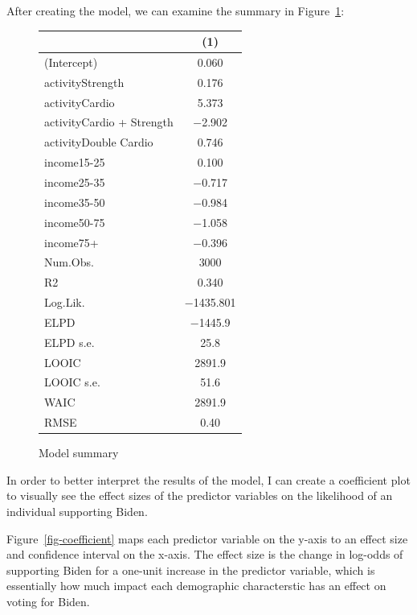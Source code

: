 \documentclass[
  letterpaper,
  DIV=11,
  numbers=noendperiod]{scrartcl}
\begin{document}
After creating the model, we can examine the summary in
Figure~\ref{fig-summary}:

\begin{figure}

{\centering 

\hypertarget{fig-summary-1}{}
\begin{table}
\centering
\begin{tabular}[t]{lc}
\toprule
  & (1)\\
\midrule
(Intercept) & \num{0.060}\\
activityStrength & \num{0.176}\\
activityCardio & \num{5.373}\\
activityCardio + Strength & \num{-2.902}\\
activityDouble Cardio & \num{0.746}\\
income15-25 & \num{0.100}\\
income25-35 & \num{-0.717}\\
income35-50 & \num{-0.984}\\
income50-75 & \num{-1.058}\\
income75+ & \num{-0.396}\\
\midrule
Num.Obs. & \num{3000}\\
R2 & \num{0.340}\\
Log.Lik. & \num{-1435.801}\\
ELPD & \num{-1445.9}\\
ELPD s.e. & \num{25.8}\\
LOOIC & \num{2891.9}\\
LOOIC s.e. & \num{51.6}\\
WAIC & \num{2891.9}\\
RMSE & \num{0.40}\\
\bottomrule
\end{tabular}
\end{table}

}

\caption{\label{fig-summary}Model summary}

\end{figure}

In order to better interpret the results of the model, I can create a
coefficient plot to visually see the effect sizes of the predictor
variables on the likelihood of an individual supporting Biden.

Figure~\ref{fig-coefficient} maps each predictor variable on the y-axis
to an effect size and confidence interval on the x-axis. The effect size
is the change in log-odds of supporting Biden for a one-unit increase in
the predictor variable, which is essentially how much impact each
demographic characterstic has an effect on voting for Biden.
\end{document}
